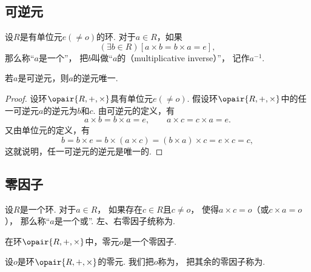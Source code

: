 \subsection{可逆元}
\begin{definition}
设\(R\)是有单位元\(e(\neq o)\)的环.
对于\(a \in R\)，如果\begin{equation*}
	(\exists b \in R)[a \times b = b \times a = e],
\end{equation*}
那么称“\(a\)是一个”，
把\(b\)叫做“\(a\)的（multiplicative inverse）”，
记作\(a^{-1}\).
\end{definition}

\begin{proposition}
若\(a\)是可逆元，则\(a\)的逆元唯一.
\begin{proof}
设环\(\opair{R,+,\times}\)具有单位元\(e(\neq o)\).
假设环\(\opair{R,+,\times}\)中的任一可逆元\(a\)的逆元为\(b\)和\(c\).
由可逆元的定义，有\begin{equation*}
	a \times b = b \times a = e,
	\qquad
	a \times c = c \times a = e.
\end{equation*}
又由单位元的定义，有\begin{equation*}
	b = b \times e
	= b \times (a \times c)
	= (b \times a) \times c
	= e \times c
	= c,
\end{equation*}
这就说明，任一可逆元的逆元是唯一的.
\end{proof}
\end{proposition}

\subsection{零因子}
\begin{definition}
设\(R\)是一个环.
对于\(a \in R\)，
如果存在\(c \in R\)且\(c \neq o\)，
使得\(a \times c = o\)（或\(c \times a = o\)），
那么称“\(a\)是一个或”.
左、右零因子统称为.
\end{definition}

\begin{proposition}
在环\(\opair{R,+,\times}\)中，零元\(o\)是一个零因子.
\end{proposition}

\begin{definition}
设\(o\)是环\(\opair{R,+,\times}\)的零元.
我们把\(o\)称为，
把其余的零因子称为.
\end{definition}

